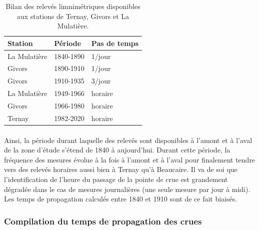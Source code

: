 \documentclass[11pt]{article}
\begin{document}
	\begin{table}[h]
	\centering
	\caption{Bilan des relevés limnimétriques disponibles aux stations de Ternay, Givors et La Mulatière.}
	\label{tab:Hternay}
		\begin{tabular}{|l|l|l|}
			\hline
			Station      & Période   & Pas de temps \\ \hline
			La Mulatière & 1840-1890 & 1/jour       \\ \hline
			Givors       & 1890-1910 & 1/jour       \\ \hline
			Givors       & 1910-1935 & 3/jour       \\ \hline
			La Mulatière & 1949-1966 & horaire      \\ \hline
			Givors       & 1966-1980 & horaire      \\ \hline
			Ternay       & 1982-2020 & horaire      \\ \hline
		\end{tabular}
	\end{table}

	
	\paragraph{} Ainsi, la période durant laquelle des relevés sont disponibles à l'amont et à l'aval de la zone d'étude s'étend de 1840 à aujourd'hui. Durant cette période, la fréquence des mesures évolue à la fois à l'amont et à l'aval pour finalement tendre vers des relevés horaires aussi bien à Ternay qu'à Beaucaire. Il va de soi que l'identification de l'heure du passage de la pointe de crue est grandement dégradée dans le cas de mesures journalières (une seule mesure par jour à midi). Les temps de propagation calculés entre 1840 et 1910 sont de ce fait biaisés.
	
	
\FloatBarrier
	\subsubsection{Compilation du temps de propagation des crues}

	
\end{document}
